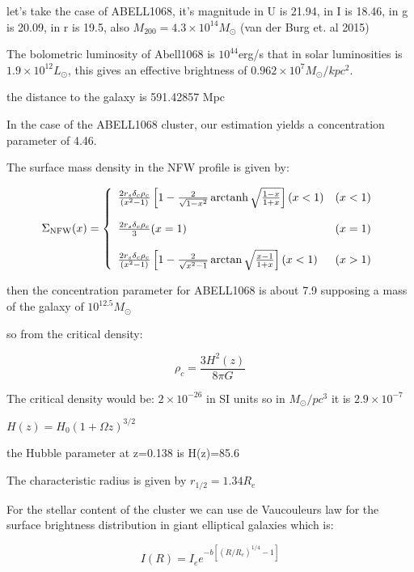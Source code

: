let's take the case of ABELL1068, it's magnitude in U is 21.94, in I is 18.46, in g is 20.09, in r is 19.5, also $M_{200}=4.3\times 10^{14}M_{\odot}$ (van der Burg et. al 2015)

The bolometric luminosity of Abell1068 is $10^{44}$erg/s that in solar luminosities is $1.9\times 10^{12} L_{\odot}$, this gives an effective brightness of $0.962\times 10^{7}M_{\odot}/kpc^2$.

the distance to the galaxy is 591.42857 Mpc

In the case of the ABELL1068 cluster, our estimation yields a concentration parameter of 4.46.

The surface mass density in the NFW profile is given by:

\begin{equation}
\Sigma_{\text{NFW}}(x) = \left\lbrace
\begin{array}{lll}
\frac{2r_{s}\delta_{c}\rho_{c}}{\left(x^{2}-1\right)}\left[1-\frac{2}{\sqrt{1-x^{2}}}\operatorname{arctanh}\sqrt{\frac{1-x}{1+x}}\right](x<1) & (x<1)\\\\
\frac{2r_{s}\delta_{c}\rho_{c}}{3}(x=1) & (x=1)\\\\
\frac{2r_{s}\delta_{c}\rho_{c}}{\left(x^{2}-1\right)}\left[1-\frac{2}{\sqrt{x^{2}-1}}\arctan\sqrt{\frac{x-1}{1+x}}\right](x<1) & (x>1)
\end{array}
\right.
\end{equation} 

then the concentration parameter for ABELL1068 is about 7.9 supposing a mass of the galaxy of $10^{12.5}M_{\odot}$

so from the critical density:

\begin{equation}
\rho_{c}=\frac{3H^2(z)}{8\pi G}
\end{equation}

The critical density would be: $2\times 10^{-26}$ in SI units so in $M_{\odot}/pc^{3}$ it is $2.9\times 10^{-7}$

$H(z)=H_{0}(1+\Omega z)^{3/2}$

the Hubble parameter at z=0.138 is H(z)=85.6

The characteristic radius is given by $r_{1/2}=1.34R_{e}$

For the stellar content of the cluster we can use de Vaucouleurs law for the surface brightness distribution in giant elliptical galaxies which is:

\begin{equation}
I(R)=I_{e}e^{-b\left[\left(R/R_{e}\right)^{1/4}-1\right]}
\end{equation}

